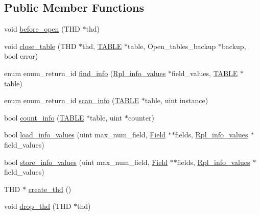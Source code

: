 \subsection*{Public Member Functions}
\begin{DoxyCompactItemize}
\item 
void \mbox{\hyperlink{classRpl__info__table__access_a6d1ae1c8dce3fd9e3f8906acef95e9e3}{before\+\_\+open}} (T\+HD $\ast$thd)
\item 
void \mbox{\hyperlink{classRpl__info__table__access_a794ff171859b531d48de28866f928953}{close\+\_\+table}} (T\+HD $\ast$thd, \mbox{\hyperlink{structTABLE}{T\+A\+B\+LE}} $\ast$table, Open\+\_\+tables\+\_\+backup $\ast$backup, bool error)
\item 
enum enum\+\_\+return\+\_\+id \mbox{\hyperlink{classRpl__info__table__access_a5e29192cc9274209edbf201622fdf161}{find\+\_\+info}} (\mbox{\hyperlink{classRpl__info__values}{Rpl\+\_\+info\+\_\+values}} $\ast$field\+\_\+values, \mbox{\hyperlink{structTABLE}{T\+A\+B\+LE}} $\ast$table)
\item 
enum enum\+\_\+return\+\_\+id \mbox{\hyperlink{classRpl__info__table__access_ac36dfa252b97f8afcc2822739ac1996a}{scan\+\_\+info}} (\mbox{\hyperlink{structTABLE}{T\+A\+B\+LE}} $\ast$table, uint instance)
\item 
bool \mbox{\hyperlink{classRpl__info__table__access_a642d37a8573636286459b57561e58382}{count\+\_\+info}} (\mbox{\hyperlink{structTABLE}{T\+A\+B\+LE}} $\ast$table, uint $\ast$counter)
\item 
bool \mbox{\hyperlink{classRpl__info__table__access_a37e78e5841dad69026ce825f9d4bcb3a}{load\+\_\+info\+\_\+values}} (uint max\+\_\+num\+\_\+field, \mbox{\hyperlink{classField}{Field}} $\ast$$\ast$fields, \mbox{\hyperlink{classRpl__info__values}{Rpl\+\_\+info\+\_\+values}} $\ast$field\+\_\+values)
\item 
bool \mbox{\hyperlink{classRpl__info__table__access_a7e9e44fcec5cbd4eb2acc5d5ae829cee}{store\+\_\+info\+\_\+values}} (uint max\+\_\+num\+\_\+field, \mbox{\hyperlink{classField}{Field}} $\ast$$\ast$fields, \mbox{\hyperlink{classRpl__info__values}{Rpl\+\_\+info\+\_\+values}} $\ast$field\+\_\+values)
\item 
T\+HD $\ast$ \mbox{\hyperlink{classRpl__info__table__access_a0ad9070e4ec45e56b0ab4750d1239d32}{create\+\_\+thd}} ()
\item 
void \mbox{\hyperlink{classRpl__info__table__access_a64ca1d0f697dc903e54a15247af9a0b4}{drop\+\_\+thd}} (T\+HD $\ast$thd)
\end{DoxyCompactItemize}
